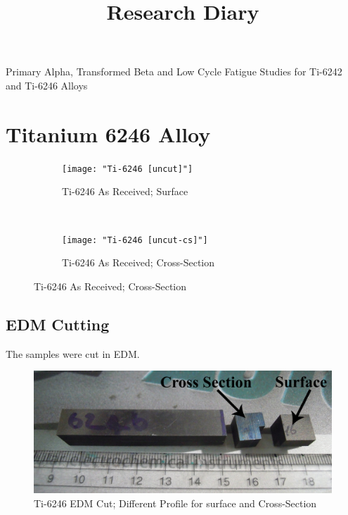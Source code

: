 \documentclass[11pt,letterpaper]{article}
\begin{document}
 
\graphicspath{{../Images/}} 





\title{Research Diary}

{\Huge Primary Alpha, Transformed Beta and Low Cycle Fatigue Studies for Ti-6242 and Ti-6246 Alloys}\\[5mm]

\section*{Titanium 6246 Alloy} 

\begin{figure}[H]
    \centering
    \begin{subfigure}{0.40\textwidth}
        \texttt{[image: "Ti-6246 [uncut]"]}
        \caption{Ti-6246 As Received; Surface}
        \label{fig:2a}
    \end{subfigure}
    ~
    \begin{subfigure}{0.40\textwidth}
        \texttt{[image: "Ti-6246 [uncut-cs]"]}
        \caption{Ti-6246 As Received; Cross-Section}
        \label{fig:2b}
    \end{subfigure}
    \label{fig:As-Received}
\end{figure}


\subsection*{EDM Cutting}
The samples were cut in EDM.

\begin{figure}[H]
    \centering
        \includegraphics[width=\textwidth]{"Ti-6246 [cut-EDM]"}
        \caption{Ti-6246 EDM Cut; Different Profile for surface and Cross-Section}
    \label{fig:EDM-Cut}
\end{figure}
\end{document}
